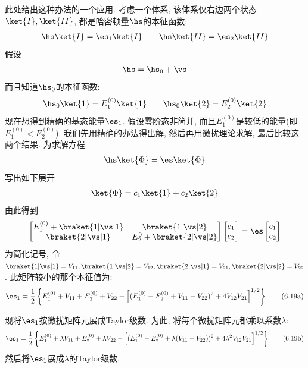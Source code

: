 此处给出这种办法的一个应用. 
考虑一个体系, 
该体系仅右边两个状态$\ket{I},\ket{II}$, 
都是哈密顿量$\hs$的本征函数:
\begin{align*}
\hs\ket{I} = \es_1\ket{I} \qquad \hs\ket{II} = \es_2\ket{II}
\end{align*}
假设
\begin{align*}
\hs=\hs_0+\vs
\end{align*}
而且知道$\hs_0$的本征函数:
\begin{align*}
\hs_0\ket{1} = E_1^{(0)}\ket{1}\qquad \hs_0\ket{2} = E_2^{(0)}\ket{2}
\end{align*}
现在想得到精确的基态能量$\es_1$. 
假设零阶态非简并, 
而且$E_1^{(0)}$是较低的能量(即$E_1^{(0)} < E_2^{(0)}$). 
我们先用精确的办法得出解, 
然后再用微扰理论求解, 
最后比较这两个结果. 
为求解方程
\begin{align}
\hs\ket{\Phi}=\es\ket{\Phi}
\end{align}
写出如下展开
\begin{align}
\ket{\Phi} = c_1\ket{1} + c_2\ket{2}
\end{align}
由此得到
\begin{align}
\begin{bmatrix}
E_1^{(0)} + \braket{1|\vs|1} & \braket{1|\vs|2}\\
\braket{2|\vs|1}			& E_2^{0} + \braket{2|\vs|2}
\end{bmatrix}
\begin{bmatrix}
c_1\\c_2
\end{bmatrix}
=
\es\begin{bmatrix}
c_1\\c_2
\end{bmatrix}
\end{align}
为简化记号, 
令$\braket{1|\vs|1}=V_{11},\braket{1|\vs|2}=V_{12},\braket{2|\vs|1}=V_{21},\braket{2|\vs|2}=V_{22}$. 
此矩阵较小的那个本征值为:
\begin{align}
\es_1 = \frac{1}{2} \left\{  E_1^{(0)} + V_{11} + E_2^{(0)} + V_{22} - \left[ (E_1^{(0)} -E_{2}^{(0)} + V_{11} - V_{22})^2 +4V_{12}V_{21} \right]^{1/2}      \right\}\tag{6.19a}
\addtocounter{equation}{1}
\end{align}

现将$\es_1$按微扰矩阵元展成Taylor级数. 
 为此, 
将每个微扰矩阵元都乘以系数$\lambda$:
\begin{align}
\es_1 = \frac{1}{2} \left\{  E_1^{(0)} + \lambda V_{11} + E_2^{(0)} + \lambda V_{22} - \left[ (E_1^{(0)} -E_{2}^{(0)} + \lambda(V_{11} - V_{22}))^2 +4\lambda^2 V_{12}V_{21} \right]^{1/2}      \right\}\tag{6.19b}
\end{align}
然后将$\es_1$展成$\lambda$的Taylor级数.


